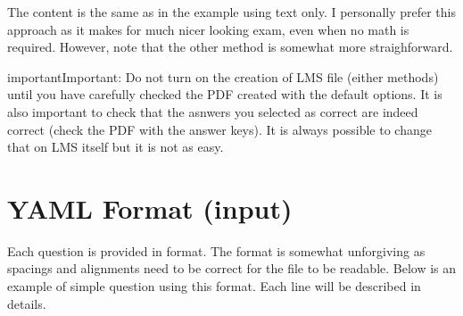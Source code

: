 \documentclass[letterpaper,10pt,english]{sphinxmanual}
\begin{document}
The content is the same as in the example using text only. I personally prefer this approach as it makes for much nicer looking exam, even when no math is required. However, note that the other method is somewhat more straighforward.

\begin{sphinxadmonition}{important}{Important:}
Do not turn on the creation of LMS file (either methods) until you have carefully checked the PDF created with the default options. It is also important to check that the asnwers you selected as correct are indeed correct (check the PDF with the answer keys). It is always possible to change that on LMS itself but it is not as easy.
\end{sphinxadmonition}


\chapter{YAML Format (input)}
\label{\detokenize{Question format:yaml-format-input}}\label{\detokenize{Question format:my-reference-label}}\label{\detokenize{Question format::doc}}
Each question is provided in  format. The format is somewhat unforgiving as spacings and alignments need to be correct for the file to be readable. Below is an example of simple question using this format. Each line will be described in details.
\end{document}
